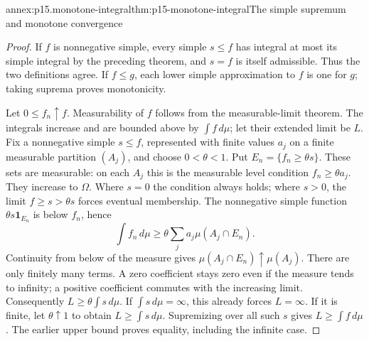\begin{annexitem}{annex:p15.monotone-integral}{thm:p15-monotone-integral}{The simple supremum and monotone convergence}
\begin{proof}
If \(f\) is nonnegative simple, every simple \(s\leq f\) has
integral at most its simple integral by the preceding theorem, and
\(s=f\) is itself admissible. Thus the two definitions agree.
If \(f\leq g\), each lower simple approximation to \(f\) is
one for \(g\); taking suprema proves monotonicity.

Let \(0\leq f_n\uparrow f\). Measurability of \(f\) follows
from the measurable-limit theorem. The integrals increase and are
bounded above by \(\int f\,d\mu\); let their extended limit be
\(L\). Fix a nonnegative simple \(s\leq f\), represented with
finite values \(a_j\) on a finite measurable partition \((A_j)\),
and choose \(0<\theta<1\). Put
\(E_n=\{f_n\geq\theta s\}\). These sets are measurable: on
each \(A_j\) this is the measurable level condition
\(f_n\geq\theta a_j\). They increase to \(\Omega\).
Where \(s=0\) the condition always holds; where \(s>0\), the
limit \(f\geq s>\theta s\) forces eventual membership.
The nonnegative simple function \(\theta s\mathbf1_{E_n}\)
is below \(f_n\), hence
\[
 \int f_n\,d\mu\geq\theta\sum_j a_j\mu(A_j\cap E_n).
\]
Continuity from below of the measure gives
\(\mu(A_j\cap E_n)\uparrow\mu(A_j)\). There are only finitely
many terms. A zero coefficient stays zero even if the measure tends
to infinity; a positive coefficient commutes with the increasing limit.
Consequently \(L\geq\theta\int s\,d\mu\).
If \(\int s\,d\mu=\infty\), this already forces \(L=\infty\).
If it is finite, let \(\theta\uparrow1\) to obtain
\(L\geq\int s\,d\mu\). Supremizing over all such \(s\)
gives \(L\geq\int f\,d\mu\). The earlier upper bound proves
equality, including the infinite case.
\end{proof}
\end{annexitem}

